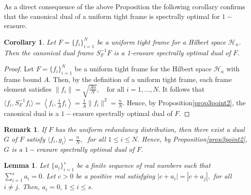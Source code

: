 \documentclass[final,1p,times]{elsarticle}
\newtheorem{lem}[thm]{Lemma}
\newtheorem{rem}[thm]{Remark}
\newtheorem{cor}[thm]{Corollary}
\begin{document}
As a direct consequence of the above Proposition the following corollary confirms that the canonical dual of a uniform tight frame is spectrally optimal for $1-$erasure.


\begin{cor}
Let \( F = \{f_i\}_{i=1}^N \) be a uniform tight frame for a Hilbert space \( \mathcal{H}_n \). Then the canonical dual frame \( S_F^{-1}F \) is a 1-erasure spectrally optimal dual of \( F \).
\end{cor}


    \begin{proof}
Let \( F = \{f_i\}_{i=1}^N \) be a uniform tight frame for the Hilbert space \( \mathcal{H}_n \) with frame bound \( A \). Then, by the definition of a uniform tight frame, each frame element satisfies $\|f_i\| = \sqrt{\frac{An}{N}}, \quad \text{for all } i = 1, \dots, N.$ It follows that $\langle f_i, S_{F}^{-1}f_i \rangle = \left\langle f_i, \frac{1}{A} f_i \right\rangle = \frac{1}{A} \|f_i\|^2 = \frac{n}{N}.$ Hence, by Proposition\ref{prop3point2}, the canonical dual is a $1-$erasure spectrally optimal dual of \( F \).
\end{proof}



\begin{rem}
		If $F$ has the uniform redundancy distribution, then there exist a dual $G$  of $F$ satisfy $\langle f_i, g_i \rangle =  \frac{n}{N},\;$ for all $1 \leq i \leq N. $ Hence, by Proposition\ref{prop3point2}, $G$ is a $1-$erasure spectrally optimal dual of \( F \).
	\end{rem}

    \begin{lem}\label{lemma3point5}
    Let $\{a_i\}_{i=1}^s$ be a finite sequence of real numbers such that $\sum\limits_{i=1}^s a_i =0.$ Let $c>0$ be a positive real satisfying $|c+a_i|= |c+a_j|,$ for all $i \neq j.$ Then, $a_i =0,\, 1 \leq i \leq s.$
\end{lem}


\end{document}
